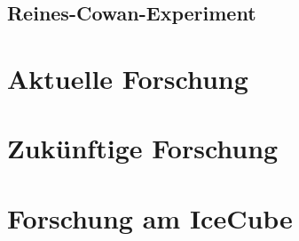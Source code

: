     \subsection{Reines-Cowan-Experiment}
    \section{Aktuelle Forschung}
    \section{Zukünftige Forschung}
    \section{Forschung am IceCube}